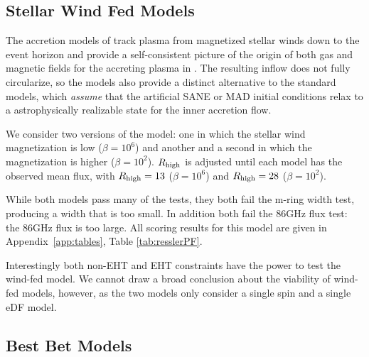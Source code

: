 \subsection{Stellar Wind Fed Models}

The accretion models of \cite{2020ApJ...896L...6R, 2020MNRAS.492.3272R, 2018MNRAS.478.3544R} track plasma from  magnetized stellar winds down to the event horizon and provide a self-consistent picture of the origin of both gas and magnetic fields for the accreting plasma in \sgra.  The resulting inflow does not fully circularize, so the models also provide a distinct alternative to the standard models, which {\em assume} that the artificial SANE or MAD initial conditions relax to a astrophysically realizable state for the inner accretion flow.

We consider two versions of the model: one in which the stellar wind magnetization is low ($\beta = 10^6$) and another and a second in which the magnetization is higher ($\beta = 10^2$). $R_\mathrm{high}$ is adjusted until each model has the observed mean flux, with $R_\mathrm{high} = 13$ ($\beta = 10^6$) and $R_\mathrm{high} = 28$ ($\beta = 10^2$).

While both models pass many of the tests, they both fail the m-ring width test, producing a width that is too small.  In addition both fail the 86GHz flux test: the 86GHz flux is too large. All scoring results for this model are given in Appendix~\ref{app:tables}, Table \ref{tab:resslerPF}.

Interestingly both non-EHT and EHT constraints have the power to test the wind-fed model.  We cannot draw a broad conclusion about the viability of wind-fed models, however, as the two models only consider a single spin and a single eDF model.

\subsection{Best Bet Models}

